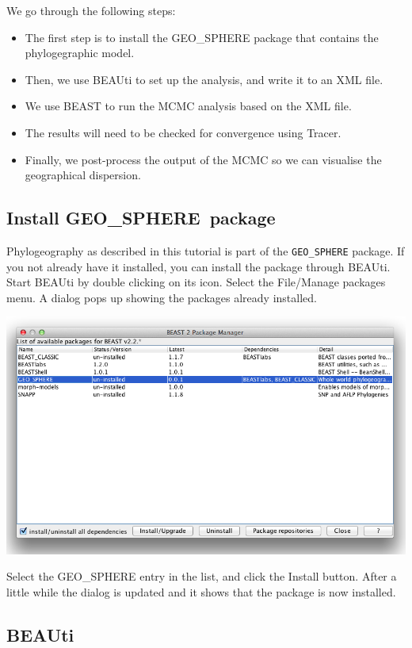 \documentclass{article}
\def\beast-geo{GEO\_SPHERE}
\begin{document}
We go through the following steps:
\begin{itemize}
\item The first step is to install the \beast-geo{} package that contains the phylogegraphic model. 
\item Then, we use BEAUti to set up the analysis, and write it to an XML file.
\item We use BEAST to run the MCMC analysis based on the XML file.
\item The results will need to be checked for convergence using Tracer.
\item Finally, we post-process the output of the MCMC so we can visualise the geographical dispersion.
\end{itemize}

\subsection*{Install \beast-geo\ package}

Phylogeography as described in this tutorial is part of the {\tt \beast-geo} package.
If you not already have it installed, you can install the package through BEAUti. Start BEAUti by double clicking on its icon. 
Select the File/Manage packages menu. A dialog pops up showing the packages already installed. 

\begin{center}
\includegraphics[scale=0.4]{figures/addonmgr.png}
\end{center}

Select the \beast-geo{} entry in the list, and click the Install button. After a little while the dialog is updated and it shows that the package is now installed.

\subsection*{BEAUti}
\end{document}
